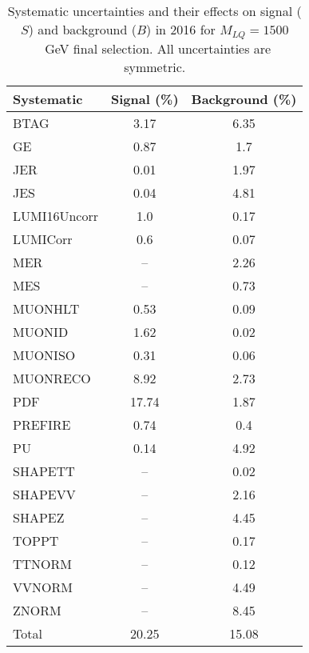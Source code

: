 \begin{table}[htbp]
\begin{center}
\caption{Systematic uncertainties and their effects on signal ($S$) and background ($B$) in 2016 for $M_{LQ}=1500$~GeV final selection. All uncertainties are symmetric.}
\begin{tabular}{lcc}
\hline\hline
Systematic & Signal (\%) & Background (\%) \\ \hline 
BTAG & 3.17 & 6.35\\ 
GE & 0.87 & 1.7\\ 
JER & 0.01 & 1.97\\ 
JES & 0.04 & 4.81\\ 
LUMI16Uncorr & 1.0 & 0.17\\ 
LUMICorr & 0.6 & 0.07\\ 
MER & -- & 2.26\\ 
MES & -- & 0.73\\ 
MUONHLT & 0.53 & 0.09\\ 
MUONID & 1.62 & 0.02\\ 
MUONISO & 0.31 & 0.06\\ 
MUONRECO & 8.92 & 2.73\\ 
PDF & 17.74 & 1.87\\ 
PREFIRE & 0.74 & 0.4\\ 
PU & 0.14 & 4.92\\ 
SHAPETT & -- & 0.02\\ 
SHAPEVV & -- & 2.16\\ 
SHAPEZ & -- & 4.45\\ 
TOPPT & -- & 0.17\\ 
TTNORM & -- & 0.12\\ 
VVNORM & -- & 4.49\\ 
ZNORM & -- & 8.45\\ 
Total & 20.25 & 15.08\\ \hline \hline
\end{tabular}
\label{tab:SysUncertainties_uujj_1500}
\end{center}
\end{table}

